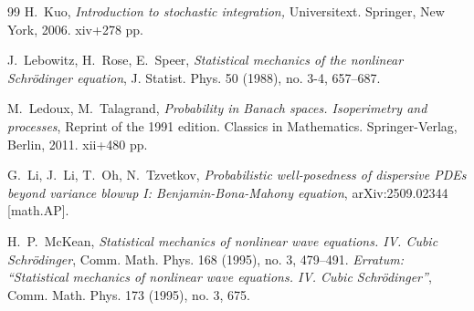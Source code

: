 \documentclass[letterpaper, 11pt,  reqno]{amsart}
\newcommand{\1}{\hspace{0.5mm}\text{I}\hspace{0.2mm}}
\numberwithin{equation}{section}
\numberwithin{theorem}{section}
\begin{document}
\begin{thebibliography}{99}
H.~Kuo, 
{\it Introduction to stochastic integration,} Universitext. Springer, New York, 2006. xiv+278 pp.


%
%
%
%



J.~Lebowitz, H.~Rose, E.~Speer, 
{\it Statistical mechanics of the nonlinear Schr\"odinger equation}, J. Statist. Phys. 50 (1988), no. 3-4, 657--687.


M.~Ledoux, M.~Talagrand,
{\it Probability in Banach spaces.
Isoperimetry and processes}, 
Reprint of the 1991 edition. Classics in Mathematics. Springer-Verlag, Berlin, 2011. xii+480 pp. 



G.~Li, J.~Li, T.~Oh, N.~Tzvetkov, 
{\it Probabilistic well-posedness of dispersive PDEs beyond variance blowup I: Benjamin-Bona-Mahony equation}, 
arXiv:2509.02344 [math.AP].








%
%
%
%
%

H.~P.~McKean,
{\it Statistical mechanics of nonlinear wave equations. IV. Cubic Schr\"odinger}, 
Comm. Math. Phys. 168 (1995), no. 3, 479--491.
{\it Erratum: ``Statistical mechanics of nonlinear wave equations. IV. Cubic Schr\"odinger''}, 
Comm. Math. Phys. 173 (1995), no. 3, 675.


%
%




\end{thebibliography}
\end{document}
